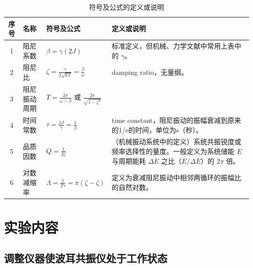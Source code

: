 \documentclass[12pt,a4paper]{amsart}
\begin{document}
\begin{table}
    \centering
    \caption{符号及公式的定义或说明}
    \begin{tabular}{cp{3cm}p{3.5cm}p{6.5cm}}
        \toprule
        序号 & 名称         & 符号及公式                                                             & 定义或说明                                                                                                                              \\
        \midrule
        1    & 阻尼系数     & $\beta = \gamma (2J)$                                                  & 标准定义，但机械、力学文献中常用上表中的 $\gamma$。                                                                                     \\
        2    & 阻尼比       & $\zeta = \frac{\gamma}{2 \sqrt{kJ}} = \frac{\beta}{\omega}$            & damping ratio，无量纲。                                                                                                                 \\
        3    & 阻尼振动周期 & $T = \frac{2\pi}{\omega - \beta}$ 或 $\frac{2\pi}{\sqrt{1 - \zeta^2}}$ &                                                                                                                                         \\
        4    & 时间常数     & $\tau = \frac{2J}{\gamma} = \frac{1}{\beta}$                           & time constant，阻尼振动的振幅衰减到原来的1/e的时间，单位为s（秒）。                                                                     \\
        5    & 品质因数     & $Q = \frac{1}{2\zeta}$                                                 & （机械振动系统中的定义）系统共振锐度或频率选择性的量度。一般定义为系统储能 $E$ 与周期能耗 $\Delta E$ 之比（$E/\Delta E$）的 $2\pi$ 倍。 \\
        6    & 对数减缩率   & $\Lambda = \frac{1}{T\tau} = \pi(\zeta - \zeta)$                       & 定义为衰减阻尼振动中相邻两循环的振幅比的自然对数。                                                                                      \\
        \bottomrule
    \end{tabular}
\end{table}


\section{实验内容}

\subsection{调整仪器使波耳共振仪处于工作状态}
\end{document}
